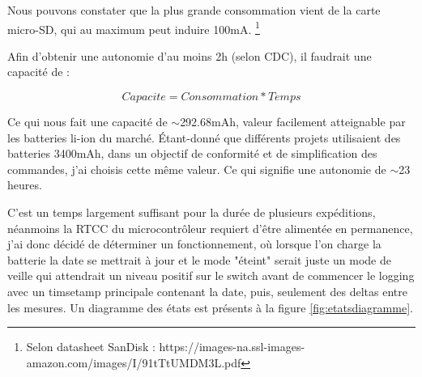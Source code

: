 {{		\begin{center}
			   \fbox{\textit{\textcolor{red}{Carte-SD - 100mA}}}   
		\end{center}
		
		Nous pouvons constater que la plus grande consommation vient de la carte micro-SD, qui au maximum peut induire 100mA. \footnote{Selon datasheet SanDisk : https://images-na.ssl-images-amazon.com/images/I/91tTtUMDM3L.pdf}
		
		
		Afin d'obtenir une autonomie d'au moins 2h (selon CDC), il faudrait une capacité de :
		
		\begin{equation}
			Capacite = Consommation * Temps
		\end{equation}
		
		Ce qui nous fait une capacité de $\sim$292.68mAh, valeur facilement atteignable par les batteries li-ion du marché. Étant-donné que différents projets utilisaient des batteries 3400mAh, dans un objectif de conformité et de simplification des commandes, j'ai choisis cette même valeur.
		Ce qui signifie une autonomie de $\sim$23 heures.
		
		C'est un temps largement suffisant pour la durée de plusieurs expéditions, néanmoins la RTCC du microcontrôleur requiert d'être alimentée en permanence, j'ai donc décidé de déterminer un fonctionnement, où lorsque l'on charge la batterie la date se mettrait à jour et le mode "éteint" serait juste un mode de veille qui attendrait un niveau positif sur le switch avant de commencer le logging avec un timsetamp principale contenant la date, puis, seulement des deltas entre les mesures. Un diagramme des états est présents à la figure \ref{fig:etatsdiagramme}.
		
}}
